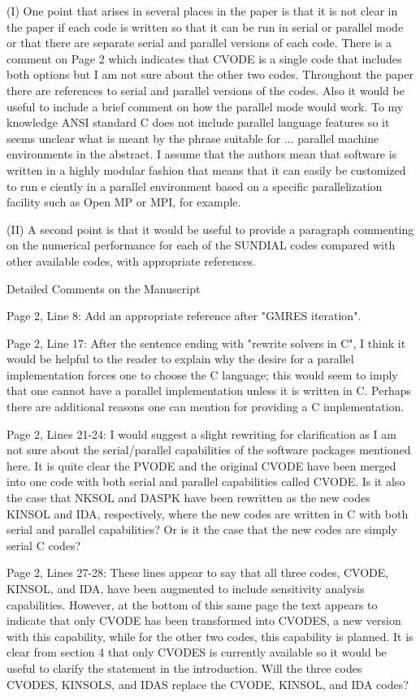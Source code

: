 (I) One point that arises in several places in the paper is that it is
not clear in the paper if each code is written so that it can be run
in serial or parallel mode or that there are separate serial and
parallel versions of each code. There is a comment on Page 2 which
indicates that CVODE is a single code that includes both options but I
am not sure about the other two codes.  Throughout the paper there are
references to serial and parallel versions of the codes.  Also it
would be useful to include a brief comment on how the parallel mode
would work.  To my knowledge ANSI standard C does not include parallel
language features so it seems unclear what is meant by the phrase
suitable for ... parallel machine environments in the abstract.  I
assume that the authors mean that software is written in a highly
modular fashion that means that it can easily be customized to run e
ciently in a parallel environment based on a specific parallelization
facility such as Open MP or MPI, for example.

(II) A second point is that it would be useful to provide a paragraph
commenting on the numerical performance for each of the SUNDIAL codes
compared with other available codes, with appropriate references.

Detailed Comments on the Manuscript

Page 2, Line 8: Add an appropriate reference after "GMRES iteration".  

Page 2, Line 17: After the sentence ending with "rewrite solvers in C",
I think it would be helpful to the reader to explain why the desire
for a parallel implementation forces one to choose the C language;
this would seem to imply that one cannot have a parallel
implementation unless it is written in C. Perhaps there are additional
reasons one can mention for providing a C implementation. 

Page 2, Lines 21-24: I would suggest a slight rewriting for
clarification as I am not sure about the serial/parallel capabilities
of the software packages mentioned here. It is quite clear the PVODE
and the original CVODE have been merged into one code with both serial
and parallel capabilities called CVODE. Is it also the case that NKSOL
and DASPK have been rewritten as the new codes KINSOL and IDA,
respectively, where the new codes are written in C with both serial
and parallel capabilities? Or is it the case that the new codes are
simply serial C codes?

Page 2, Lines 27-28: These lines appear to say that all three codes,
CVODE, KINSOL, and IDA, have been augmented to include sensitivity
analysis capabilities. However, at the bottom of this same page the
text appears to indicate that only CVODE has been transformed into
CVODES, a new version with this capability, while for the other two
codes, this capability is planned. It is clear from section 4 that
only CVODES is currently available so it would be useful to clarify
the statement in the introduction. Will the three codes CVODES,
KINSOLS, and IDAS replace the CVODE, KINSOL, and IDA codes?

